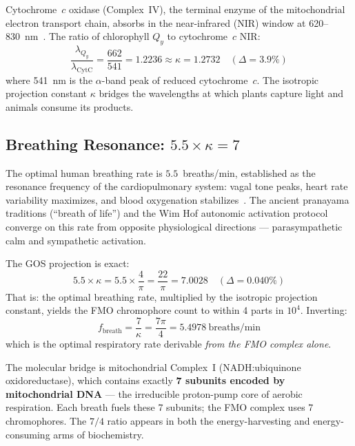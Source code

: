 \documentclass[11pt,twocolumn]{article}
\begin{document}
Cytochrome~$c$ oxidase (Complex~IV), the terminal enzyme of the
mitochondrial electron transport chain, absorbs in the near-infrared
(NIR) window at 620--830~nm~\cite{Hamblin2016}.  The ratio of
chlorophyll $Q_y$ to cytochrome~$c$ NIR:
\begin{equation}
  \frac{\lambda_{Q_y}}{\lambda_{\text{CytC}}}
  = \frac{662}{541} = 1.2236
  \approx \kappa = 1.2732 \quad (\Delta = 3.9\%)
  \label{eq:cytc_kappa}
\end{equation}
where 541~nm is the $\alpha$-band peak of reduced cytochrome~$c$.
The isotropic projection constant $\kappa$ bridges the wavelengths
at which plants capture light and animals consume its products.

\subsection{Breathing Resonance: $5.5 \times \kappa = 7$}
\label{sec:breathing}

The optimal human breathing rate is $5.5$~breaths/min, established as the
resonance frequency of the cardiopulmonary system: vagal tone peaks,
heart rate variability maximizes, and blood oxygenation
stabilizes~\cite{Nestor2020}.  The ancient pranayama traditions
(``breath of life'') and the Wim Hof autonomic activation
protocol~\cite{Kox2014} converge on this rate from opposite
physiological directions --- parasympathetic calm and sympathetic
activation.

The GOS projection is exact:
\begin{equation}
  5.5 \times \kappa = 5.5 \times \frac{4}{\pi}
  = \frac{22}{\pi} = 7.0028
  \quad (\Delta = 0.040\%)
  \label{eq:breathing}
\end{equation}
That is: the optimal breathing rate, multiplied by the isotropic
projection constant, yields the FMO chromophore count to within 4 parts
in $10^4$.  Inverting:
\begin{equation}
  f_{\mathrm{breath}} = \frac{7}{\kappa}
  = \frac{7\pi}{4} = 5.4978~\text{breaths/min}
\end{equation}
which is the optimal respiratory rate derivable \emph{from the FMO
complex alone}.

The molecular bridge is mitochondrial Complex~I (NADH:ubiquinone
oxidoreductase), which contains exactly \textbf{7 subunits encoded by
mitochondrial DNA} --- the irreducible proton-pump core of aerobic
respiration.  Each breath fuels these 7 subunits; the FMO complex uses
7 chromophores.  The $7/4$ ratio appears in both the energy-harvesting
and energy-consuming arms of biochemistry.
\end{document}
